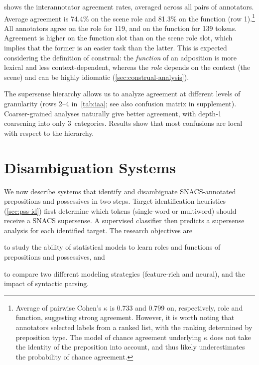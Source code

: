 \pdfoutput=1 \documentclass[11pt,a4paper]{article}
\begin{document}
 shows the interannotator agreement rates, averaged across all pairs of annotators. 
Average agreement is 74.4\% on the scene role and 81.3\% on the function (row 1).\footnote{Average of pairwise Cohen's $\kappa$ is 0.733 and 0.799 on, respectively, role and function, suggesting strong agreement. However, it is worth noting that annotators selected labels from a ranked list, with the ranking determined by preposition type. The model of chance agreement underlying $\kappa$ does not take the identity of the preposition into account, and thus likely underestimates the probability of chance agreement.}
All annotators agree on the role for 119, and on the function for 139 tokens.
Agreement is higher on the function slot than on the scene role slot, which implies that the former is an easier task than the latter. This is expected considering the definition of construal: the \textit{function} of an adposition is more lexical and less context-dependent, whereas the \textit{role} depends on the context (the scene)
and can be highly idiomatic (\cref{sec:construal-analysis}). 

The supersense hierarchy allows us to analyze agreement at different levels of granularity (rows 2--4 in~\cref{tab:iaa}; see also confusion matrix in supplement). Coarser-grained analyses naturally give better agreement, with depth-1 coarsening into only 3~categories. Results show that most confusions are local with respect to the hierarchy. 




\section{Disambiguation Systems}
\label{sec:disambig}

We now describe systems that identify and disambiguate SNACS-annotated prepositions and possessives in two steps.
Target identification heuristics (\cref{sec:pss-id})
first determine which tokens (single-word or multiword) 
should receive a SNACS supersense.  
A supervised classifier then predicts a supersense analysis for each identified target. 
The research objectives are
\begin{inparaenum}[(a)]
\item to study the ability of statistical models to learn roles and functions of prepositions and possessives, and
\item to compare two different modeling strategies (feature-rich and neural), and 
the impact of syntactic parsing.
\end{inparaenum} 
\end{document}
